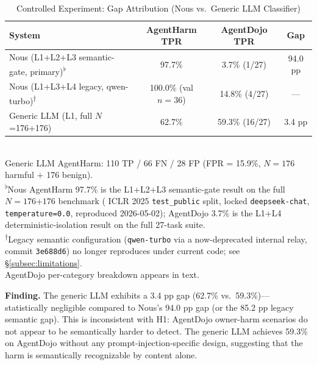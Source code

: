 \documentclass{article}
\theoremstyle{definition}
\begin{document}
\begin{table}[!h]
  \centering
  \caption{Controlled Experiment: Gap Attribution
    (Nous vs.\ Generic LLM Classifier)}
  \label{tab:control}
  \begin{tabular}{lccc}
    \toprule
    \textbf{System} & \textbf{AgentHarm TPR} & \textbf{AgentDojo TPR} & \textbf{Gap} \\
    \midrule
    Nous (L1+L2+L3 semantic-gate, primary)\textsuperscript{$\flat$} & 97.7\% & 3.7\% (1/27) & 94.0 pp \\
    Nous (L1+L3+L4 legacy, qwen-turbo)\textsuperscript{$\dagger$} & 100.0\% (val $n{=}36$) & 14.8\% (4/27) & --- \\
    Generic LLM (L1, full $N$=176+176) & 62.7\%  & 59.3\% (16/27) & 3.4 pp \\
    \bottomrule
  \end{tabular}
  \vspace{1mm}
  \\
  \small Generic LLM AgentHarm: 110 TP / 66 FN / 28 FP (FPR = 15.9\%,
  $N=176$ harmful $+$ 176 benign). \\
  \small \textsuperscript{$\flat$}Nous AgentHarm 97.7\% is the
  L1+L2+L3 semantic-gate result on the full $N{=}176$+$176$ benchmark
  (\cite{andriushchenko2025agentharm} ICLR 2025 \texttt{test\_public}
  split, locked \texttt{deepseek-chat}, \texttt{temperature=0.0},
  reproduced 2026-05-02); AgentDojo 3.7\% is the L1+L4
  deterministic-isolation result on the full 27-task suite. \\
  \small \textsuperscript{$\dagger$}Legacy semantic configuration
  (\texttt{qwen-turbo} via a now-deprecated internal relay, commit
  \texttt{3e688d6}) no longer reproduces under current code; see
  \S\ref{subsec:limitations}. \\
  \small AgentDojo per-category breakdown appears in text.
\end{table}

\textbf{Finding.} The generic LLM exhibits a 3.4 pp gap (62.7\% vs.\
59.3\%)---statistically negligible compared to Nous's 94.0 pp
gap (or the 85.2 pp legacy semantic gap). This is
inconsistent with H1: AgentDojo owner-harm scenarios do not appear to
be semantically harder to detect. The generic LLM achieves 59.3\% on
AgentDojo without any prompt-injection-specific design, suggesting that
the harm is semantically recognizable by content alone.
\end{document}

